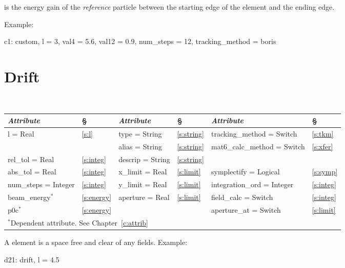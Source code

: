 is the energy gain of the {\it reference} particle
between the starting edge of the element and the ending edge.

Example:
\begin{example}
  c1: custom, l = 3, val4 = 5.6, val12 = 0.9, num_steps = 12, tracking_method = boris
\end{example}

\section{Drift}
\label{s:drift}

\begin{center}
\tt
\begin{tabular}{|l|l||l|l||l|l|} \hline
  {\sl Attribute} & \S  & {\sl Attribute} & \S & {\sl Attribute} & \S \\ \hline
  l        = Real       & \ref{s:l}     & type = String    & \ref{s:string} & tracking\_method = Switch    & \ref{s:tkm}   \\ \hline
                        &               & alias = String   & \ref{s:string} & mat6\_calc\_method = Switch  & \ref{s:xfer}  \\ \hline
  rel\_tol = Real       & \ref{s:integ} & descrip = String & \ref{s:string} &                              &               \\ \hline
  abs\_tol = Real       & \ref{s:integ} & x\_limit = Real  & \ref{s:limit}  & symplectify = Logical        & \ref{s:symp}  \\ \hline
  num\_steps = Integer  & \ref{s:integ} & y\_limit = Real  & \ref{s:limit}  & integration\_ord = Integer   & \ref{s:integ} \\ \hline
  beam\_energy$^*$      & \ref{s:energy}& aperture = Real  & \ref{s:limit}  & field\_calc = Switch         & \ref{s:integ} \\ \hline
  p0c$^*$               & \ref{s:energy}&                  &                & aperture\_at = Switch        & \ref{s:limit} \\ \hline
  \multicolumn{6}{l}{\small $^*$Dependent attribute. See Chapter~\ref{c:attrib}} \\
\end{tabular}
\end{center}
\toffset

A  element is a space free and clear of any fields.
Example:
\begin{example}
  d21: drift, l = 4.5
\end{example}

